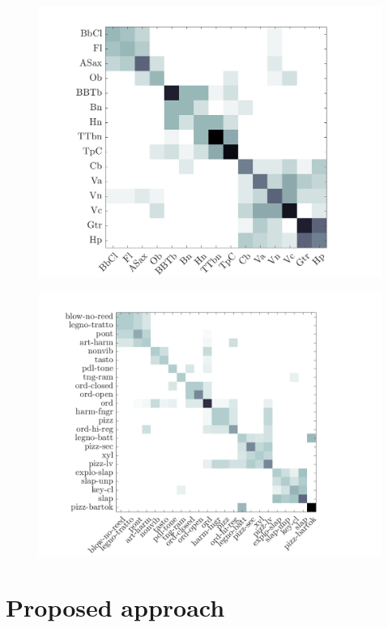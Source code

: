 \documentclass{bmcart}
\begin{document}
\begin{figure}
\center
\includegraphics[width = \textwidth]{figures/consensusVsI.png}
\caption{}
\label{fig:consensusVsI}
\end{figure}

\begin{figure}
\center
\includegraphics[width = \textwidth]{figures/consensusVsPt.png}
\caption{ }
\label{fig:consensusVsPt}
\end{figure}

\section*{Proposed approach}
\label{sec:method}
\end{document}

